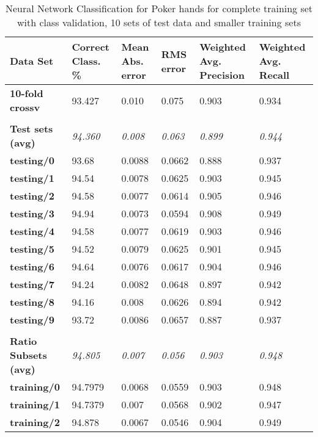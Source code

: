 \documentclass[11pt, a4paper]{article}
\begin{document}
\begin{table}[htbp]
  \centering
  \begin{tabular}{p{3cm}p{1.5cm}p{1.5cm}p{1.5cm}p{1.5cm}p{1.5cm}}
    \toprule
    \textbf{Data Set} & Correct Class. \% & Mean Abs. error & RMS error & Weighted Avg. Precision & Weighted Avg. Recall \\
    \midrule
    \textbf{10-fold crossv} & 93.427 & 0.010 & 0.075 & 0.903 & 0.934 \\
    \textbf{} &       &       &       &       &  \\
    \textbf{Test sets (avg)} & \textit{94.360} & \textit{0.008} & \textit{0.063} & \textit{0.899} & \textit{0.944} \\
    \textbf{   testing/0} & 93.68 & 0.0088 & 0.0662 & 0.888 & 0.937 \\
    \textbf{   testing/1} & 94.54 & 0.0078 & 0.0625 & 0.903 & 0.945 \\
    \textbf{   testing/2} & 94.58 & 0.0077 & 0.0614 & 0.905 & 0.946 \\
    \textbf{   testing/3} & 94.94 & 0.0073 & 0.0594 & 0.908 & 0.949 \\
    \textbf{   testing/4} & 94.58 & 0.0077 & 0.0619 & 0.903 & 0.946 \\
    \textbf{   testing/5} & 94.52 & 0.0079 & 0.0625 & 0.901 & 0.945 \\
    \textbf{   testing/6} & 94.64 & 0.0076 & 0.0617 & 0.904 & 0.946 \\
    \textbf{   testing/7} & 94.24 & 0.0082 & 0.0648 & 0.897 & 0.942 \\
    \textbf{   testing/8} & 94.16 & 0.008 & 0.0626 & 0.894 & 0.942 \\
    \textbf{   testing/9} & 93.72 & 0.0086 & 0.0657 & 0.887 & 0.937 \\
    \textbf{} &       &       &       &       &  \\
    \textbf{Ratio Subsets (avg)} & \textit{94.805} & \textit{0.007} & \textit{0.056} & \textit{0.903} & \textit{0.948} \\
    \textbf{   training/0} & 94.7979 & 0.0068 & 0.0559 & 0.903 & 0.948 \\
    \textbf{   training/1} & 94.7379 & 0.007 & 0.0568 & 0.902 & 0.947 \\
    \textbf{   training/2} & 94.878 & 0.0067 & 0.0546 & 0.904 & 0.949 \\
    \bottomrule
    \end{tabular}%


\caption{Neural Network Classification for Poker hands for complete training set with class validation, 10 sets of test data and smaller training sets}   
  \label{tab:nnresults}%
\end{table}%
\end{document}
